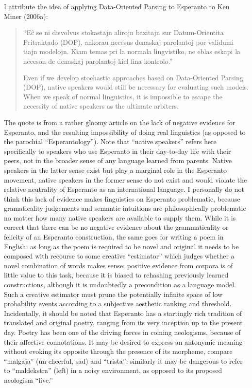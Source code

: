 \documentclass[10pt,a4paper]{article}
\begin{document}
I attribute the idea of applying Data-Oriented Parsing to Esperanto to
Ken Miner (2006a):

\begin{quote}
	``E\^c se ni disvolvus stokastajn alirojn bazitajn sur Datum-Orientita
	Pritraktado (DOP), ankorau necesus denaskaj parolantoj por validumi
	tiajn modelojn. Kiam temas pri la normala lingvistiko, ne eblas eskapi
	la neceson de denaskaj parolantoj kiel fina kontrolo.''

	Even if we develop stochastic approaches based on Data-Oriented
	Parsing (DOP), native speakers would still be necessary for evaluating
	such models. When we speak of normal linguistics, it is impossible
	to escape the necessity of native speakers as the ultimate arbiters.
\end{quote}

The quote is from a rather gloomy article on the lack of negative evidence
for Esperanto, and the resulting impossibility of doing real linguistics (as
opposed to the parochial ``Esperantology''). Note that ``native speakers''
refers here specifically to speakers who use Esperanto in their day-to-day
life with their peers, not in the broader sense of any language learned from
parents. Native speakers in the latter sense exist but play a marginal role in
the Esperanto movement, native speakers in the former sense do not exist and
would violate the relative neutrality of Esperanto as an international
language. I personally do not think this lack of evidence makes linguistics on
Esperanto problematic, because gramaticality judgements and semantic
intuitions are philosophically problematic no matter how many native speakers
are available to supply them. While it is correct that there can be no
negative evidence about the grammaticality or felicity of an Esperanto
construction, the same goes for writing a poem in English: as long as the poem
is required to be novel and original it needs to be composed with recourse to
some creative ``estimator'' which judges whether a novel combination of words
makes sense; positive evidence from corpora is of little value to this task,
because it is biased to rehashing previously learned constructions, although
it is undoubtedly a precondition as a language model.  Such a creative estimator must prune the
potentially infinite space of low probability events according to a subjective
aesthetic ranking and threshold. Incidentally, it should be noted that
Esperanto has a startingly rich tradition of translated and original poetry,
ranging from its very inception up to the present day.  Poetry has been one
of the driving forces in coining neologisms, because of their affective
connotations. It may be desired to express an antonymic meaning without
evoking its opposite through the presence of its morpheme, compare ``malgaja''
(un-cheerful, sad) and ``trista''; similarly it may be dangerous to refer to
``maldekstra'' (left) in a noisy environment, as opposed to its proposed
neologism ``live.''
\end{document}
